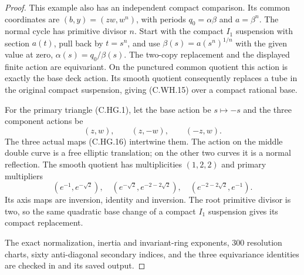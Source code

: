 \begin{proof}
This example also has an
independent compact comparison.
Its common coordinates are
$(b,y)=(zw,w^n)$, with periods
$q_0=\alpha\beta$ and
$a=\beta^n$. The normal cycle
has primitive divisor $n$.
Start with the compact $I_1$
suspension with section $a(t)$,
pull back by $t=s^n$, and use
$\beta(s)=a(s^n)^{1/n}$ with
the given value at zero,
$\alpha(s)=q_0/\beta(s)$.
The two-copy replacement and
the displayed finite action
are equivariant. On the
punctured common quotient this
action is exactly the base
deck action. Its smooth
quotient consequently replaces
a tube in the original compact
suspension, giving (C.WH.15)
over a compact rational base.

For the primary triangle
(C.HG.1), let the base action
be $s\mapsto-s$ and the three
component actions be
\[
            (z,w),\qquad(z,-w),\qquad(-z,w).
\tag{C.WH.16}
\]
The three actual maps
(C.HG.16) intertwine them.
The action on the middle
double curve is a free
elliptic translation; on
the other two curves it
is a normal reflection.
The smooth quotient has
multiplicities $(1,2,2)$
and primary multipliers
\[
 (e^{-1},e^{-\sqrt2}),\quad
 (e^{-\sqrt2},e^{-2-2\sqrt2}),\quad
 (e^{-2-2\sqrt2},e^{-1}).
\tag{C.WH.17}
\]
Its axis maps are inversion,
identity and inversion.
The root primitive divisor
is two, so the same quadratic
base change of a compact
$I_1$ suspension gives its
compact replacement.

The exact normalization,
inertia and invariant-ring
exponents, 300 resolution
charts, sixty anti-diagonal
secondary indices, and the
three equivariance identities
are checked in
and its saved output.
\end{proof}

